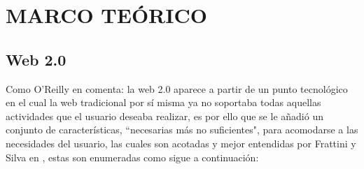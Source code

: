\documentclass[oneside,12pt,a4paper]{memoir}%
\begin{document}
\chapter{MARCO TE\'ORICO}
\label{chap:Process}
	\section{Web 2.0}
	\label{sec:Web20}
	Como O'Reilly en \cite{OReilly2007} comenta: la web 2.0 aparece a partir de
	un punto tecnol\'ogico en el cual la web tradicional por s\'i misma ya no
	soportaba todas aquellas actividades que el usuario deseaba realizar, es por
	ello que se le a\~nadi\'o un conjunto de caracter\'isticas, ``necesarias m\'as
	no suficientes", para acomodarse a las necesidades del usuario, las cuales son
	acotadas y mejor entendidas por Frattini y Silva en \cite{Frattini2007},
	estas son enumeradas como sigue a continuaci\'on:
	
\end{document}
